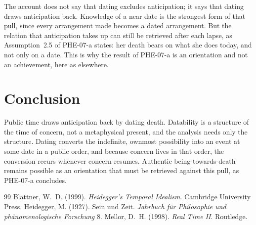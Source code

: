 \documentclass{situationist-preprint}
\begin{document}
\begin{reply}
The account does not say that dating excludes anticipation; it says that dating draws anticipation back. Knowledge of a near date is the strongest form of that pull, since every arrangement made becomes a dated arrangement. But the relation that anticipation takes up can still be retrieved after each lapse, as Assumption~2.5 of PHE-07-a states: her death bears on what she does today, and not only on a date. This is why the result of PHE-07-a is an orientation and not an achievement, here as elsewhere.
\end{reply}

\section{Conclusion}

Public time draws anticipation back by dating death. Datability is a structure of the time of concern, not a metaphysical present, and the analysis needs only the structure. Dating converts the indefinite, ownmost possibility into an event at some date in a public order, and because concern lives in that order, the conversion recurs whenever concern resumes. Authentic being-towards-death remains possible as an orientation that must be retrieved against this pull, as PHE-07-a concludes.

\begin{thebibliography}{99}\small
{} Blattner, W.~D. (1999). \emph{Heidegger's Temporal Idealism}. Cambridge University Press.
 Heidegger, M. (1927). Sein und Zeit. \emph{Jahrbuch für Philosophie und phänomenologische Forschung} 8.
 Mellor, D.~H. (1998). \emph{Real Time II}. Routledge.
\end{thebibliography}
\end{document}
